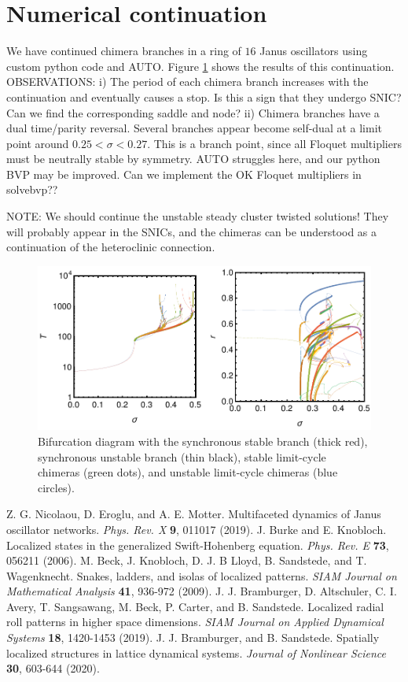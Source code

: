 \documentclass[aps,pre,amsmath,amssymb,floatfix,onecolumn,notitlepage,10pt]{revtex4-1}
\begin{document}
\section{Numerical continuation}
We have continued chimera branches in a ring of $16$ Janus oscillators using custom python code and AUTO. Figure \ref{fig1} shows the results of this continuation. OBSERVATIONS: i) The period of each chimera branch increases with the continuation and eventually causes a stop. Is this a sign that they undergo SNIC? Can we find the corresponding saddle and node? ii) Chimera branches have a dual time/parity reversal. Several branches appear become self-dual at a limit point around $0.25<\sigma<0.27$. This is a branch point, since all Floquet multipliers must be neutrally stable by symmetry. AUTO struggles here, and our python BVP may be improved. Can we implement the OK Floquet multipliers in solvebvp??

NOTE: We should continue the unstable steady cluster twisted solutions! They will probably appear in the SNICs, and the chimeras can be understood as a continuation of the heteroclinic connection.

\begin{figure}[hb]
\includegraphics[width=\columnwidth]{diagram.pdf}
\caption{Bifurcation diagram with the synchronous stable branch (thick red), synchronous unstable branch (thin black), stable limit-cycle chimeras (green dots), and unstable limit-cycle chimeras (blue circles). \label{fig1}}
\end{figure}
\begin{thebibliography}{99}
 Z. G. Nicolaou, D. Eroglu, and A. E. Motter. Multifaceted dynamics of Janus oscillator networks. \textit{Phys. Rev. X} \textbf{9}, 011017 (2019).
 J. Burke and E. Knobloch. Localized states in the generalized Swift-Hohenberg equation. \textit{Phys. Rev. E} \textbf{73}, 056211 (2006).
 M. Beck, J. Knobloch, D. J. B Lloyd, B. Sandstede, and T. Wagenknecht. Snakes, ladders, and isolas of localized patterns. \textit{SIAM Journal on Mathematical Analysis} \textbf{41}, 936-972 (2009).
J. J. Bramburger, D. Altschuler, C. I. Avery, T. Sangsawang, M. Beck, P. Carter, and B. Sandstede. Localized radial roll patterns in higher space dimensions. \textit{SIAM Journal on Applied Dynamical Systems} \textbf{18}, 1420-1453 (2019).
J. J. Bramburger, and B. Sandstede. Spatially localized structures in lattice dynamical systems. \textit{Journal of Nonlinear Science} \textbf{30}, 603-644 (2020).
\end{thebibliography}
\end{document}
